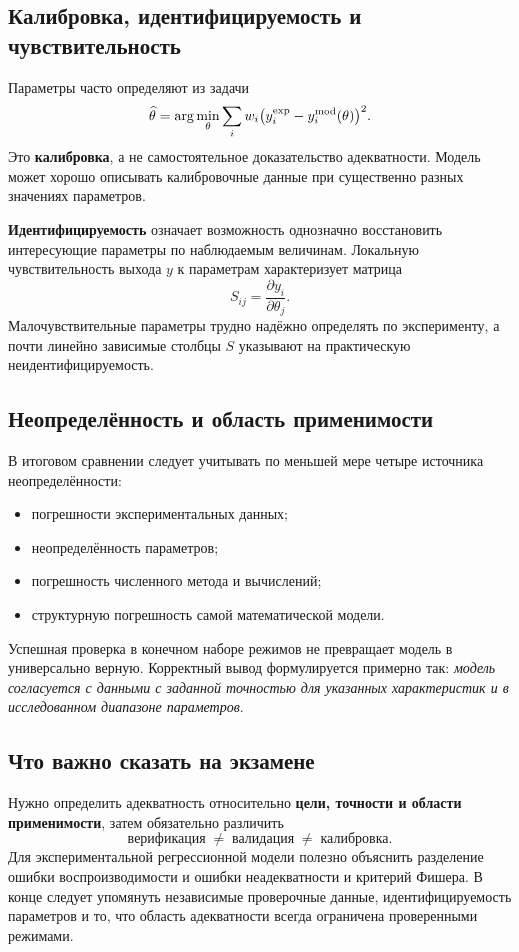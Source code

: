 \subsection{Калибровка, идентифицируемость и чувствительность}

Параметры часто определяют из задачи
\[
    \widehat\theta
    =\arg\min_{\theta}
    \sum_i w_i
    \bigl(y_i^{\rm exp}-y_i^{\rm mod}(\theta)\bigr)^2.
\]
Это \textbf{калибровка}, а не самостоятельное доказательство адекватности.
Модель может хорошо описывать калибровочные данные при существенно разных
значениях параметров.

\textbf{Идентифицируемость} означает возможность однозначно восстановить
интересующие параметры по наблюдаемым величинам. Локальную чувствительность
выхода $y$ к параметрам характеризует матрица
\[
    S_{ij}=\frac{\partial y_i}{\partial\theta_j}.
\]
Малочувствительные параметры трудно надёжно определять по эксперименту, а почти
линейно зависимые столбцы $S$ указывают на практическую неидентифицируемость.

\subsection{Неопределённость и область применимости}

В итоговом сравнении следует учитывать по меньшей мере четыре источника
неопределённости:
\begin{itemize}
    \item погрешности экспериментальных данных;
    \item неопределённость параметров;
    \item погрешность численного метода и вычислений;
    \item структурную погрешность самой математической модели.
\end{itemize}

Успешная проверка в конечном наборе режимов не превращает модель в универсально
верную. Корректный вывод формулируется примерно так: \emph{модель согласуется с
данными с заданной точностью для указанных характеристик и в исследованном
диапазоне параметров}.

\subsection{Что важно сказать на экзамене}

Нужно определить адекватность относительно \textbf{цели, точности и области
применимости}, затем обязательно различить
\[
\boxed{\text{верификация}\;\neq\;\text{валидация}\;\neq\;\text{калибровка}}.
\]
Для экспериментальной регрессионной модели полезно объяснить разделение ошибки
воспроизводимости и ошибки неадекватности и критерий Фишера. В конце следует
упомянуть независимые проверочные данные, идентифицируемость параметров и то, что
область адекватности всегда ограничена проверенными режимами.

\newpage
